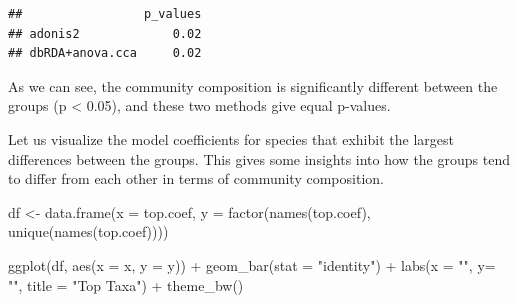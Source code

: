\documentclass[
]{book}
\newenvironment{Shaded}{\begin{snugshade}}{\end{snugshade}}
\newcommand{\AttributeTok}[1]{\textcolor[rgb]{0.77,0.63,0.00}{#1}}
\newcommand{\CommentTok}[1]{\textcolor[rgb]{0.56,0.35,0.01}{\textit{#1}}}
\newcommand{\ConstantTok}[1]{\textcolor[rgb]{0.00,0.00,0.00}{#1}}
\newcommand{\DecValTok}[1]{\textcolor[rgb]{0.00,0.00,0.81}{#1}}
\newcommand{\FunctionTok}[1]{\textcolor[rgb]{0.00,0.00,0.00}{#1}}
\newcommand{\NormalTok}[1]{#1}
\newcommand{\OtherTok}[1]{\textcolor[rgb]{0.56,0.35,0.01}{#1}}
\newcommand{\SpecialCharTok}[1]{\textcolor[rgb]{0.00,0.00,0.00}{#1}}
\newcommand{\StringTok}[1]{\textcolor[rgb]{0.31,0.60,0.02}{#1}}
\begin{document}
\begin{verbatim}
##                 p_values
## adonis2             0.02
## dbRDA+anova.cca     0.02
\end{verbatim}

As we can see, the community composition is significantly different
between the groups (p \textless{} 0.05), and these two methods give equal p-values.

Let us visualize the model coefficients for species that exhibit the
largest differences between the groups. This gives some insights into
how the groups tend to differ from each other in terms of community
composition.

\begin{Shaded}
\end{Shaded}

\begin{Shaded}
\begin{Highlighting}[]
\NormalTok{df }\OtherTok{\textless{}{-}} \FunctionTok{data.frame}\NormalTok{(}\AttributeTok{x =}\NormalTok{ top.coef,}
                 \AttributeTok{y =} \FunctionTok{factor}\NormalTok{(}\FunctionTok{names}\NormalTok{(top.coef), }\FunctionTok{unique}\NormalTok{(}\FunctionTok{names}\NormalTok{(top.coef))))}

\FunctionTok{ggplot}\NormalTok{(df, }\FunctionTok{aes}\NormalTok{(}\AttributeTok{x =}\NormalTok{ x, }\AttributeTok{y =}\NormalTok{ y)) }\SpecialCharTok{+}
  \FunctionTok{geom\_bar}\NormalTok{(}\AttributeTok{stat =} \StringTok{"identity"}\NormalTok{) }\SpecialCharTok{+}
  \FunctionTok{labs}\NormalTok{(}\AttributeTok{x =} \StringTok{""}\NormalTok{, }\AttributeTok{y=} \StringTok{""}\NormalTok{, }\AttributeTok{title =} \StringTok{"Top Taxa"}\NormalTok{) }\SpecialCharTok{+}
  \FunctionTok{theme\_bw}\NormalTok{()}
\end{Highlighting}
\end{Shaded}
\end{document}
